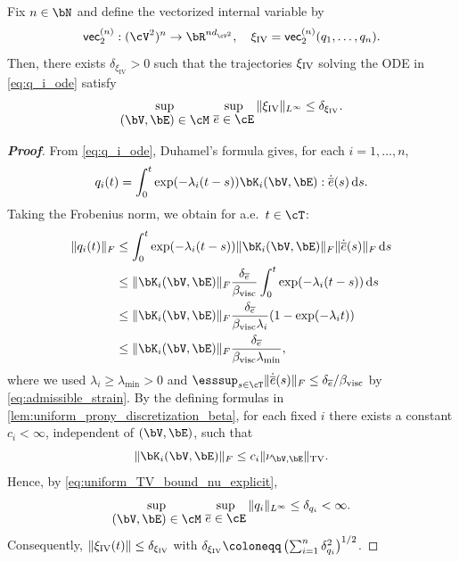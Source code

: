 \begin{lemma}\label{lem:ua_step3_targets}
Fix $n\in\bN$ and define the vectorized internal variable by
\begin{equation*}
    \mathsf{vec}_2^{(n)}:(\cV^{2})^n\to \bR^{nd_{\cV^2}}, \quad \xi_{\mathrm{IV}} = \mathsf{vec}_2^{(n)}(q_1, \dots, q_n).
\end{equation*}
Then, there exists $\delta_{\xi_{\mathrm{IV}}}>0$ such that the trajectories $\xi_{\rm IV}$ solving the ODE in \cref{eq:q_i_ode} satisfy
\begin{equation*}
    \sup_{\displaystyle(\bV,\bE)\in\cM}\, \sup_{\displaystyle\overline{e}\in\cE} \|\xi_{\mathrm{IV}}\|_{L^{\infty}} \le \delta_{\xi_{\mathrm{IV}}}.
\end{equation*}
\end{lemma}

\begin{proof}[\bf Proof]
From \cref{eq:q_i_ode}, Duhamel's formula gives, for each $i=1,\dots,n$,
\begin{equation*}
    q_i(t)=\int_0^t \exp(-\lambda_i(t-s))\bK_i(\bV,\bE):\dot{\overline{e}}(s)\,\mathrm{d}s.
\end{equation*}
Taking the Frobenius norm, we obtain for a.e.\ $t\in\cT$:
\begin{align*}
    \|q_i(t)\|_F &\le \int_0^t \exp(-\lambda_i(t-s)) \|\bK_i(\bV,\bE)\|_F \|\dot{\overline{e}}(s)\|_F \,\mathrm{d}s \\
    &\le \|\bK_i(\bV,\bE)\|_F \frac{\delta_{\overline{e}}}{\beta_{\rm visc}} \int_0^t \exp(-\lambda_i(t-s)) \,\mathrm{d}s \\
    &\le \|\bK_i(\bV,\bE)\|_F \frac{\delta_{\overline{e}}}{\beta_{\rm visc} \lambda_i} (1 - \exp(-\lambda_i t)) \\
    &\le \|\bK_i(\bV,\bE)\|_F \frac{\delta_{\overline{e}}}{\beta_{\rm visc} \lambda_{\min}},
\end{align*}
where we used $\lambda_i\ge \lambda_{\min}>0$ and $\esssup_{s\in\cT}\|\dot{\overline{e}}(s)\|_F\leq \delta_{\overline{e}}/\beta_{\rm visc}$ by \cref{eq:admissible_strain}.
By the defining formulas in \cref{lem:uniform_prony_discretization_beta}, for each fixed $i$ there exists a constant $c_i<\infty$, independent of $(\bV,\bE)$, such that
\begin{equation*}
\|\bK_i(\bV,\bE)\|_F\le c_i\|\nu_{\bV,\bE}\|_{\mathrm{TV}}.
\end{equation*}
Hence, by \cref{eq:uniform_TV_bound_nu_explicit},
\begin{equation*}
    \sup_{\displaystyle (\bV,\bE)\in\cM}\,\sup_{\displaystyle \overline{e}\in\cE}\|q_i\|_{L^{\infty}}\leq \delta_{q_i} <\infty.
\end{equation*}
Consequently, $\|\xi_{\mathrm{IV}}(t)\|\leq \delta_{\xi_{\rm IV}}$ with $\delta_{\xi_{\rm IV}}\coloneqq \left(\sum_{i=1}^n \delta_{q_i}^2\right)^{1/2}$.

\end{proof}

